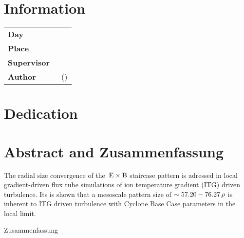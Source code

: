 \restoregeometry

\chapter*{Information}
\label{chap:info}

\begin{tabular}{l l}

	{\textbf{Day}} \hspace{1cm} & \hspace{1cm} {\datum}\\[0,2cm]
	{\textbf{Place}} \hspace{1cm} & \hspace{1cm} {\platz}\\[0,2cm]
	{\textbf{Supervisor}} \hspace{1cm} & \hspace{1cm} {\betreuer}\\[1,2cm]
	{\textbf{Author}} \hspace{1cm} & \hspace{1cm} {\teilnehmerm~(\emailm)}\\

\end{tabular}

\newpage

\chapter*{Dedication}
\label{chap:dedication}


\chapter*{Abstract and Zusammenfassung}
\label{chap:abstract}

The radial size convergence of the $\mathrm{\:E}\times\mathrm{B}$ staircase pattern is adressed in local gradient-driven flux tube simulations of ion temperature gradient (ITG) driven turbulence.
Its is shown that a mesoscale pattern size of $\sim 57.20-76.27\,\rho$ is inherent to ITG driven turbulence with Cyclone Base Case parameters in the local limit.
\bigskip 
\bigskip 
\bigskip 

Zusammenfassung